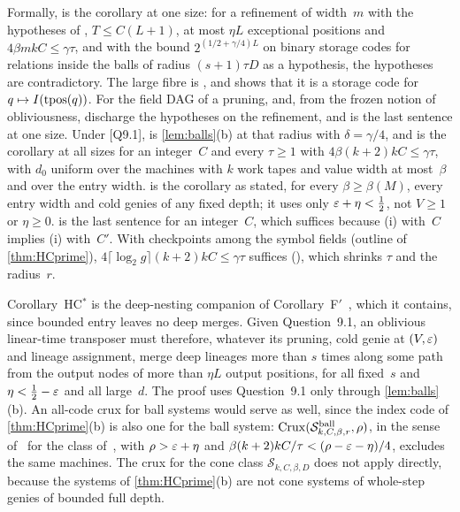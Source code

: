 \begin{outline}
Formally,  is the corollary at one size: for a refinement of width~$m$ with the
hypotheses of , $T\le C(L+1)$, at most $\eta L$ exceptional positions and
$4\beta mkC\le\gamma\tau$, and with the bound $2^{(1/2+\gamma/4)L}$ on binary storage codes for relations inside the balls
of radius $(s+1)\tau D$ as a hypothesis, the hypotheses are contradictory. The large fibre is
, and  shows that it is a
storage code for $q\mapsto I(\operatorname{tpos}(q))$. For the field DAG of a pruning,  and, from
the frozen notion of obliviousness,  discharge the hypotheses on the refinement, and
 is the last sentence at one size. Under [Q9.1],
 is \cref{lem:balls}(b) at that radius with $\delta=\gamma/4$, and
 is the corollary at all sizes for an integer~$C$ and every $\tau\ge1$ with
$4\beta(k+2)kC\le\gamma\tau$, with $d_0$ uniform over the machines with $k$ work tapes and value width at most~$\beta$ and
over the entry width.  is the corollary as stated, for every $\beta\ge\beta(M)$,
every entry width and cold genies of any fixed depth; it uses only $\varepsilon+\eta<\frac12$, not $V\ge1$ or $\eta\ge0$.
 is the last sentence for an integer~$C$, which suffices because (i) with~$C$
implies (i) with~$C'$. With checkpoints among the symbol fields (outline of \cref{thm:HCprime}),
$4\lceil\log_2g\rceil(k+2)kC\le\gamma\tau$ suffices (), which shrinks $\tau$ and
the radius~$r$.
\end{outline}

Corollary~HC$^*$ is the deep-nesting companion of Corollary~F$'$~\cite[Corollary~6.3]{BoundedNesting2026}, which it
contains, since bounded entry leaves no deep merges. Given Question~9.1, an oblivious linear-time transposer must
therefore, whatever its pruning, cold genie at $(V,\varepsilon)$ and lineage assignment, merge deep lineages more than $s$
times along some path from the output nodes of more than $\eta L$ output positions, for all fixed~$s$ and
$\eta<\frac12-\varepsilon$ and all large~$d$. The proof uses Question~9.1 only through \cref{lem:balls}(b). An all-code crux for
ball systems would serve as well, since the index code of \cref{thm:HCprime}(b) is also one for the ball system:
$\mathrm{Crux}(\mathcal S^{\mathrm{ball}}_{k,C,\beta,r},\rho)$, in the sense of~\cite[Definition~4.8]{FourthPaper2026} for the class
of~\cite[Definition~7.4]{BoundedNesting2026}, with $\rho>\varepsilon+\eta$ and $\beta(k+2)kC/\tau<(\rho-\varepsilon-\eta)/4$, excludes
the same machines. The crux for the cone class $\mathcal S_{k,C,\beta,D}$ does not apply directly, because the systems of
\cref{thm:HCprime}(b) are not cone systems of whole-step genies of bounded full depth.

